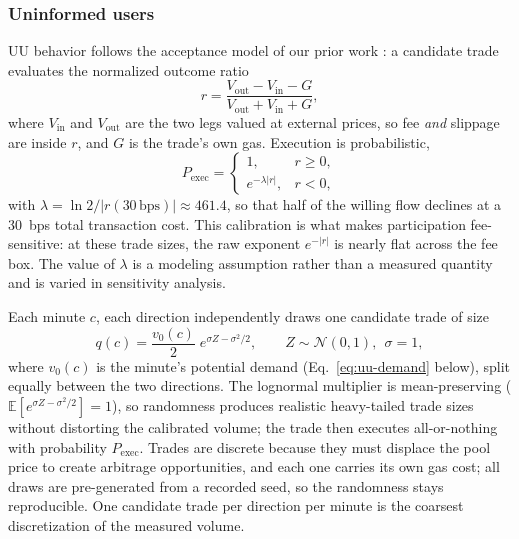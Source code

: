 \documentclass[a4paper,conference]{IEEEtran}
\begin{document}
\subsubsection{Uninformed users}
UU behavior follows the acceptance model of our prior work
\cite{lebedeva2025dynamic}: a candidate trade evaluates the normalized
outcome ratio
\begin{equation}
  r=\frac{V_{\mathrm{out}}-V_{\mathrm{in}}-G}
  {V_{\mathrm{out}}+V_{\mathrm{in}}+G},
  \label{eq:uu-r}
\end{equation}
where $V_{\mathrm{in}}$ and $V_{\mathrm{out}}$ are the two legs valued
at external prices, so fee \emph{and} slippage are inside $r$, and
$G$ is the trade's own gas. Execution is probabilistic,
\begin{equation}
  P_{\mathrm{exec}}=
  \begin{cases}
    1, & r\ge 0,\\
    e^{-\lambda|r|}, & r<0,
  \end{cases}
  \label{eq:uu-p}
\end{equation}
with $\lambda=\ln 2/|r(30\,\mathrm{bps})|
\approx 461.4$, so that half of the willing flow declines at a 30~bps
total transaction cost. This calibration is what makes participation
fee-sensitive: at these trade sizes, the raw exponent
$e^{-|r|}$ is nearly flat across the fee box. The value of
$\lambda$ is a modeling assumption rather than a measured quantity and
is varied in sensitivity analysis.

Each minute $c$, each direction independently draws one candidate trade
of size
\begin{equation}
  q(c)=\frac{v_0(c)}{2}\;e^{\sigma Z-\sigma^{2}/2},
  \qquad Z\sim\mathcal{N}(0,1),\ \ \sigma=1,
  \label{eq:uu-size}
\end{equation}
where $v_0(c)$ is the minute's potential demand
(Eq.~\eqref{eq:uu-demand} below), split equally between the two
directions. The lognormal multiplier is mean-preserving
($\mathbb{E}[e^{\sigma Z-\sigma^{2}/2}]=1$), so randomness produces
realistic heavy-tailed trade sizes without distorting the calibrated
volume; the trade then executes all-or-nothing with probability
$P_{\mathrm{exec}}$. Trades are discrete because they must displace the
pool price to create arbitrage opportunities, and each one carries its
own gas cost; all draws are pre-generated from a recorded seed, so the
randomness stays reproducible. One candidate trade per direction per
minute is the coarsest discretization of the measured volume.
\end{document}
